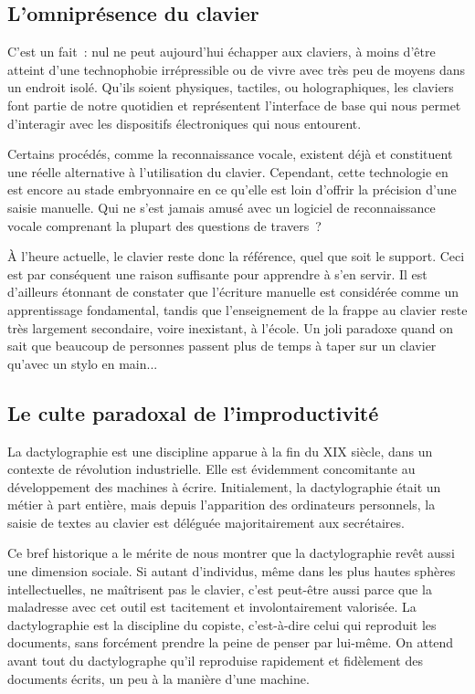 \documentclass[a4paper,12pt]{article}
\begin{document}
\subsection{L'omniprésence du clavier}

C'est un fait~: nul ne peut aujourd'hui échapper aux claviers, à moins d'être atteint d'une technophobie irrépressible ou de vivre avec très peu de moyens dans un endroit isolé. Qu'ils soient physiques, tactiles, ou holographiques, les claviers font partie de notre quotidien et représentent l'interface de base qui nous permet d'interagir avec les dispositifs électroniques qui nous entourent.

Certains procédés, comme la reconnaissance vocale, existent déjà et constituent une réelle alternative à l'utilisation du clavier. Cependant, cette technologie en est encore au stade embryonnaire en ce qu'elle est loin d'offrir la précision d'une saisie manuelle. Qui ne s'est jamais amusé avec un logiciel de reconnaissance vocale comprenant la plupart des questions de travers~?

À l'heure actuelle, le clavier reste donc la référence, quel que soit le support. Ceci est par conséquent une raison suffisante pour apprendre à s'en servir. Il est d'ailleurs étonnant de constater que l'écriture manuelle est considérée comme un apprentissage fondamental, tandis que l'enseignement de la frappe au clavier reste très largement secondaire, voire inexistant, à l'école. Un joli paradoxe quand on sait que beaucoup de personnes passent plus de temps à taper sur un clavier qu'avec un stylo en main...

\subsection{Le culte paradoxal de l'improductivité}

La dactylographie est une discipline apparue à la fin du XIX\ieme{} siècle, dans un contexte de révolution industrielle. Elle est évidemment concomitante au développement des machines à écrire. Initialement, la dactylographie était un métier à part entière, mais depuis l'apparition des ordinateurs personnels, la saisie de textes au clavier est déléguée majoritairement aux secrétaires.

Ce bref historique a le mérite de nous montrer que la dactylographie revêt aussi une dimension sociale. Si autant d'individus, même dans les plus hautes sphères intellectuelles, ne maîtrisent pas le clavier, c'est peut-être aussi parce que la maladresse avec cet outil est tacitement et involontairement valorisée. La dactylographie est la discipline du copiste, c'est-à-dire celui qui reproduit les documents, sans forcément prendre la peine de penser par lui-même. On attend avant tout du dactylographe qu'il reproduise rapidement et fidèlement des documents écrits, un peu à la manière d'une machine.
\end{document}
